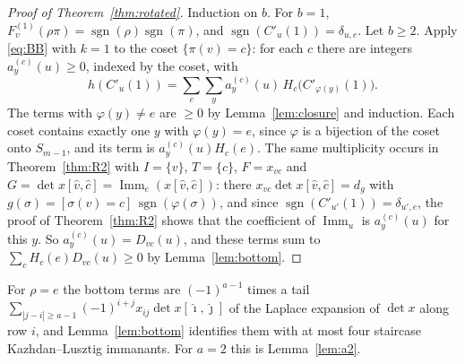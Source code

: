 \documentclass[11pt]{amsart}
\theoremstyle{definition}
\theoremstyle{remark}
\newcommand{\Imm}{\operatorname{Imm}}
\newcommand{\sgn}{\operatorname{sgn}}
\newcommand{\Cp}[1]{C'_{#1}(1)}
\begin{document}
\begin{proof}[Proof of Theorem~\ref{thm:rotated}]
Induction on $b$. For $b=1$, $F^{(1)}_v(\rho\pi)=\sgn(\rho)\sgn(\pi)$, and $\sgn(\Cp u)=\delta_{u,e}$. Let $b\ge2$. Apply \eqref{eq:BB} with $k=1$ to the coset $\{\pi(v)=c\}$: for each $c$ there are integers $a^{(c)}_y(u)\ge0$, indexed by the coset, with
\[
h(\Cp u)=\sum_c\sum_{y}a^{(c)}_y(u)\,H_c\bigl(\Cp{\varphi(y)}\bigr).
\]
The terms with $\varphi(y)\ne e$ are $\ge0$ by Lemma~\ref{lem:closure} and induction. Each coset contains exactly one $y$ with $\varphi(y)=e$, since $\varphi$ is a bijection of the coset onto $S_{m-1}$, and its term is $a^{(c)}_y(u)H_c(e)$. The same multiplicity occurs in Theorem~\ref{thm:R2} with $I=\{v\}$, $T=\{c\}$, $F=x_{vc}$ and $G=\det x[\hat v,\hat c]=\Imm_e(x[\hat v,\hat c])$: there $x_{vc}\det x[\hat v,\hat c]=d_g$ with $g(\sigma)=[\sigma(v)=c]\,\sgn(\varphi(\sigma))$, and since $\sgn(\Cp{u'})=\delta_{u',e}$, the proof of Theorem~\ref{thm:R2} shows that the coefficient of $\Imm_u$ is $a^{(c)}_y(u)$ for this $y$. So $a^{(c)}_y(u)=D_{vc}(u)$, and these terms sum to $\sum_cH_c(e)D_{vc}(u)\ge0$ by Lemma~\ref{lem:bottom}.
\end{proof}

For $\rho=e$ the bottom terms are $(-1)^{a-1}$ times a tail $\sum_{|j-i|\ge a-1}(-1)^{i+j}x_{ij}\det x[\hat\imath,\hat\jmath]$ of the Laplace expansion of $\det x$ along row $i$, and Lemma~\ref{lem:bottom} identifies them with at most four staircase Kazhdan--Lusztig immanants. For $a=2$ this is Lemma~\ref{lem:a2}.
\end{document}
